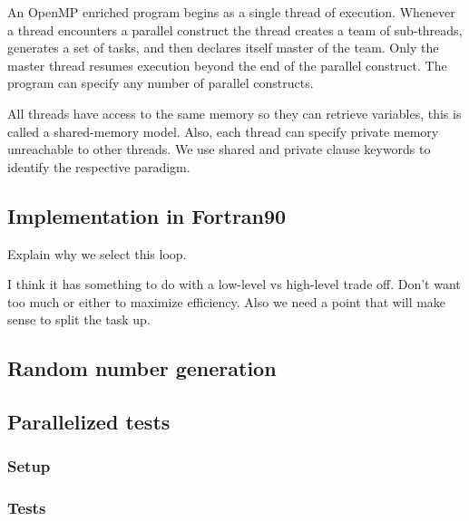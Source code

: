 An OpenMP enriched program begins as a single thread of execution.
Whenever a thread encounters a parallel construct the thread creates a team of sub-threads, generates a set of tasks, and then declares itself master of the team.
Only the master thread resumes execution beyond the end of the parallel construct.
The program can specify any number of parallel constructs.

All threads have access to the same memory so they can retrieve variables, this is called a shared-memory model.
Also, each thread can specify private memory unreachable to other threads.
We use shared and private clause keywords to identify the respective paradigm.

\subsection*{Implementation in Fortran90}
Explain why we select this loop. %

I think it has something to do with a low-level vs high-level trade off. Don't want too much or either to maximize efficiency. Also we need a point that will make sense to split the task up.


\subsection*{Random number generation}


\subsection*{Parallelized tests}

\subsubsection*{Setup}
\subsubsection*{Tests}